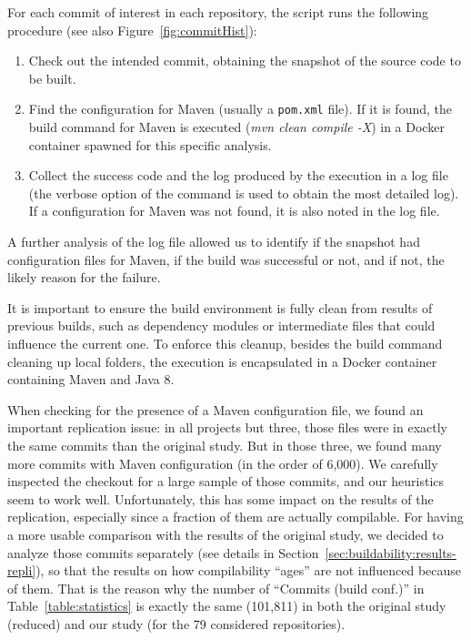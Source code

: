 For each commit of interest in each repository, the script runs the following procedure (see also Figure~\ref{fig:commitHist}):
\begin{enumerate}
\item Check out the intended commit, obtaining the snapshot of the source code to be built.
\item Find the configuration for Maven (usually a \verb|pom.xml| file). If it is found, the build command for Maven is executed (\textit{mvn clean compile -X}) in a Docker container spawned for this specific analysis.
\item Collect the success code and the log produced by the execution in a log file (the verbose option of the command is used to obtain the most detailed log). If a configuration for Maven was not found, it is also noted in the log file.
\end{enumerate}

A further analysis of the log file allowed us to identify if the snapshot had configuration files for Maven, if the build was successful or not, and if not, the likely reason for the failure.

It is important to ensure the build environment is fully clean from results of previous builds, such as dependency modules or intermediate files that could influence the current one. To enforce this cleanup, besides the build command cleaning up local folders, the execution is encapsulated in a Docker container containing Maven and Java 8.

When checking for the presence of a Maven configuration file, we found an important replication issue: in all projects but three, those files were in exactly the same commits than the original study. But in those three, we found many more commits with Maven configuration (in the order of 6,000). We carefully inspected the checkout for a large sample of those commits, and our heuristics seem to work well. Unfortunately, this has some impact on the results of the replication, especially since a fraction of them are actually compilable. For having a more usable comparison with the results of the original study, we decided to analyze those commits separately (see details in Section~\ref{sec:buildability:results-repli}), so that the results on how compilability ``ages'' are not influenced because of them. That is the reason why the number of ``Commits (build conf.)'' in Table~\ref{table:statistics} is exactly the same (101,811) in both the original study (reduced) and our study (for the 79 considered repositories).

